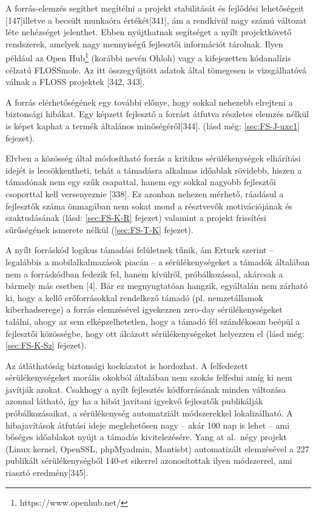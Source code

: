 \documentclass[12pt,magyar,a4paper,oneside]{scrreprt}
\begin{document}
A forrás-elemzés segíthet megítélni a projekt stabilitását és fejlődési
lehetőségeit {[}147{]}illetve a becsült munkaóra értékét{[}341{]}, ám a
rendkívül nagy számú változat léte nehézséget jelenthet. Ebben
nyújthatnak segítséget a nyílt projektkövető rendszerek, amelyek nagy
mennyiségű fejlesztői információt tárolnak. Ilyen például az Open
Hub\footnote{https://www.openhub.net/} (korábbi nevén Ohloh) vagy a
kifejezetten kódanalízis célzatú FLOSSmole. Az itt összegyűjtött adatok
által tömegesen is vizsgálhatóvá válnak a FLOSS projektek {[}342,
343{]}.

A forrás elérhetőségének egy további előnye, hogy sokkal nehezebb
elrejteni a biztonsági hibákat. Egy képzett fejlesztő a forrást átfutva
részletes elemzés nélkül is képet kaphat a termék általános
minőségéről{[}344{]}. (lásd még: \ref{sec:FS-J-uxc1} fejezet).

Elvben a közösség által módosítható forrás a kritikus sérülékenységek
elhárítási idejét is lecsökkentheti, tehát a támadásra alkalmas időablak
rövidebb, hiszen a támadónak nem egy szűk csapattal, hanem egy sokkal
nagyobb fejlesztői csoporttal kell versenyeznie {[}338{]}. Ez azonban
nehezen mérhető, ráadásul a fejlesztők száma önmagában nem sokat mond a
résztvevők motivációjának és szaktudásának (lásd: \ref{sec:FS-K-R}
fejezet) valamint a projekt frissítési sűrűségének ismerete nélkül
(\ref{sec:FS-T-K} fejezet).

A nyílt forráskód logikus támadási felületnek tűnik, ám Erturk szerint
-- legalábbis a mobilalkalmazások piacán -- a sérülékenységeket a
támadók általában nem a forráskódban fedezik fel, hanem kívülről,
próbálkozással, akárcsak a bármely más esetben {[}4{]}. Bár ez
megnyugtatóan hangzik, egyáltalán nem zárható ki, hogy a kellő
erőforrásokkal rendelkező támadó (pl. nemzetállamok kiberhadserege) a
forrás elemzésével igyekezzen zero-day sérülékenységeket találni, ahogy
az sem elképzelhetetlen, hogy a támadó fél szándékosan beépül a
fejlesztői közösségbe, hogy ott álcázott sérülékenységeket helyezzen el
(lásd még: \ref{sec:FS-K-Sz} fejezet).

Az átláthatóság biztonsági kockázatot is hordozhat. A felfedezett
sérülékenységeket morális okokból általában nem szokás felfedni amíg ki
nem javítják azokat. Csakhogy a nyílt fejlesztés kódforrásának minden
változása azonnal látható, így ha a hibát javítani igyekvő fejlesztők
publikálják próbálkozásaikat, a sérülékenység automatziált módszerekkel
lokalizálható. A hibajavítások átfutási ideje meglehetősen nagy -- akár
100 nap is lehet -- ami bőséges időablakot nyújt a támadás
kivitelezésére. Yang at al.~négy projekt (Linux kernel, OpenSSL,
phpMyadmin, Mantisbt) automatizált elemzésével a 227 publikált
sérülékenységből 140-et sikerrel azonosítottak ilyen módszerrel, ami
riasztó eredmény{[}345{]}.
\end{document}
